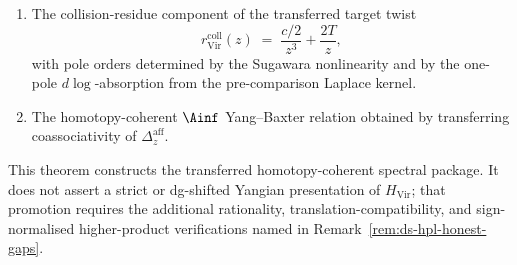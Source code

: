 \begin{theorem}
\begin{enumerate}[label=\textup{(\roman*)}]
 $\Delta_z^{\mathrm{Vir}}\colon H_{\mathrm{Vir}}
 \to H_{\mathrm{Vir}} \otimes H_{\mathrm{Vir}}$
 that is an $\Ainf$-algebra morphism with respect to the
 transferred products. This is the morphism transfer of
 $\Delta_z^{\mathrm{aff}}$ through the SDR and its tensor
 product.
\item The collision-residue component of the transferred target twist
\[
r_{\mathrm{Vir}}^{\mathrm{coll}}(z)
\;=\;
\frac{c/2}{z^3}+\frac{2T}{z},
\]
 with pole orders determined by the Sugawara nonlinearity and by the
 one-pole \(d\log\)-absorption from the pre-comparison Laplace kernel.
\item The homotopy-coherent \(\Ainf\) Yang--Baxter relation obtained
 by transferring coassociativity of \(\Delta_z^{\mathrm{aff}}\).
\end{enumerate}
This theorem constructs the transferred homotopy-coherent spectral
package.  It does not assert a strict or dg-shifted Yangian
presentation of \(H_{\mathrm{Vir}}\); that promotion requires the
additional rationality, translation-compatibility, and sign-normalised
higher-product verifications named in
Remark~\textup{\ref{rem:ds-hpl-honest-gaps}}.
\end{theorem}


